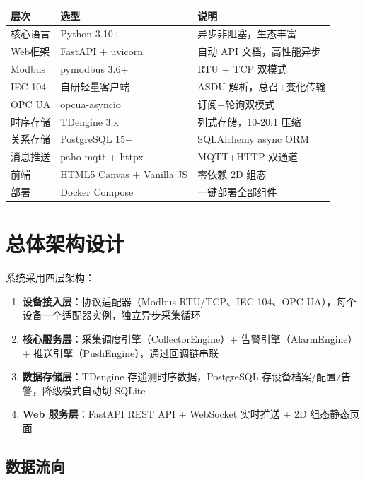 \documentclass[12pt,a4paper]{ctexart}
\begin{document}
\begin{table}[H]\centering
\begin{tabular}{p{3cm}p{4.5cm}p{5cm}}
\toprule\textbf{层次} & \textbf{选型} & \textbf{说明} \\
\midrule
核心语言 & Python 3.10+ & 异步非阻塞，生态丰富 \\
Web框架 & FastAPI + uvicorn & 自动 API 文档，高性能异步 \\
Modbus & pymodbus 3.6+ & RTU + TCP 双模式 \\
IEC 104 & 自研轻量客户端 & ASDU 解析，总召+变化传输 \\
OPC UA & opcua-asyncio & 订阅+轮询双模式 \\
时序存储 & TDengine 3.x & 列式存储，10-20:1 压缩 \\
关系存储 & PostgreSQL 15+ & SQLAlchemy async ORM \\
消息推送 & paho-mqtt + httpx & MQTT+HTTP 双通道 \\
前端 & HTML5 Canvas + Vanilla JS & 零依赖 2D 组态 \\
部署 & Docker Compose & 一键部署全部组件 \\
\bottomrule
\end{tabular}
\end{table}

\section{总体架构设计}

系统采用四层架构：

\begin{enumerate}[leftmargin=*]
  \item \textbf{设备接入层}：协议适配器（Modbus RTU/TCP、IEC 104、OPC UA），每个设备一个适配器实例，独立异步采集循环
  \item \textbf{核心服务层}：采集调度引擎（CollectorEngine）+ 告警引擎（AlarmEngine）+ 推送引擎（PushEngine），通过回调链串联
  \item \textbf{数据存储层}：TDengine 存遥测时序数据，PostgreSQL 存设备档案/配置/告警，降级模式自动切 SQLite
  \item \textbf{Web 服务层}：FastAPI REST API + WebSocket 实时推送 + 2D 组态静态页面
\end{enumerate}

\subsection{数据流向}
\end{document}
